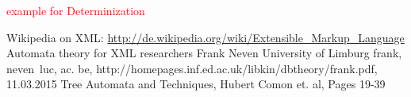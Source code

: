 \documentclass{llncs}
\begin{document}
\textcolor{red}{example for Determinization}

\newpage

%
%
\begin{thebibliography}{99}
%
	Wikipedia on XML:
	\url{http://de.wikipedia.org/wiki/Extensible\_Markup\_Language}
	Automata theory for XML researchers
	Frank Neven
	University of Limburg
	frank, neven~luc, ac. be,
	http://homepages.inf.ed.ac.uk/libkin/dbtheory/frank.pdf, 11.03.2015
	Tree Automata and Techniques, Hubert Comon et. al, Pages 19-39




\end{thebibliography}
\end{document}
